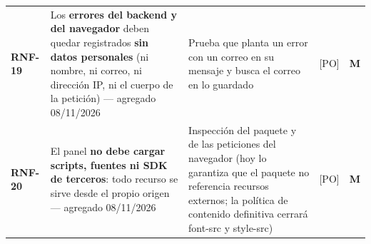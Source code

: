 \begin{longtable}{@{}C{1.5cm}L{4.9cm}L{2.4cm}L{1.4cm}C{0.8cm}@{}}
\textbf{RNF-19} & Los \textbf{errores del backend y del navegador} deben quedar registrados \textbf{sin datos personales} (ni nombre, ni correo, ni dirección IP, ni el cuerpo de la petición) --- agregado 08/11/2026 & Prueba que planta un error con un correo en su mensaje y busca el correo en lo guardado & [PO] & \textbf{M} \\
\textbf{RNF-20} & El panel \textbf{no debe cargar scripts, fuentes ni SDK de terceros}: todo recurso se sirve desde el propio origen --- agregado 08/11/2026 & Inspección del paquete y de las peticiones del navegador (hoy lo garantiza que el paquete no referencia recursos externos; la política de contenido definitiva cerrará font-src y style-src) & [PO] & \textbf{M} \\
\end{longtable}
